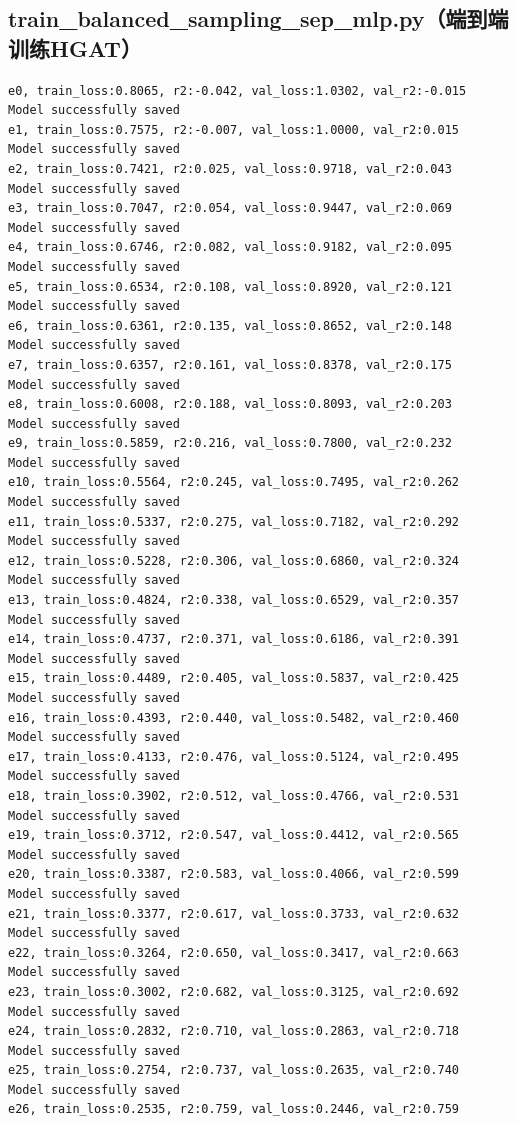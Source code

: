 \documentclass[a4paper, 12pt]{article}
\begin{document}
	\subsection{train\_balanced\_sampling\_sep\_mlp.py（端到端训练HGAT）}	
	\begin{lstlisting}
e0, train_loss:0.8065, r2:-0.042, val_loss:1.0302, val_r2:-0.015
Model successfully saved
e1, train_loss:0.7575, r2:-0.007, val_loss:1.0000, val_r2:0.015
Model successfully saved
e2, train_loss:0.7421, r2:0.025, val_loss:0.9718, val_r2:0.043
Model successfully saved
e3, train_loss:0.7047, r2:0.054, val_loss:0.9447, val_r2:0.069
Model successfully saved
e4, train_loss:0.6746, r2:0.082, val_loss:0.9182, val_r2:0.095
Model successfully saved
e5, train_loss:0.6534, r2:0.108, val_loss:0.8920, val_r2:0.121
Model successfully saved
e6, train_loss:0.6361, r2:0.135, val_loss:0.8652, val_r2:0.148
Model successfully saved
e7, train_loss:0.6357, r2:0.161, val_loss:0.8378, val_r2:0.175
Model successfully saved
e8, train_loss:0.6008, r2:0.188, val_loss:0.8093, val_r2:0.203
Model successfully saved
e9, train_loss:0.5859, r2:0.216, val_loss:0.7800, val_r2:0.232
Model successfully saved
e10, train_loss:0.5564, r2:0.245, val_loss:0.7495, val_r2:0.262
Model successfully saved
e11, train_loss:0.5337, r2:0.275, val_loss:0.7182, val_r2:0.292
Model successfully saved
e12, train_loss:0.5228, r2:0.306, val_loss:0.6860, val_r2:0.324
Model successfully saved
e13, train_loss:0.4824, r2:0.338, val_loss:0.6529, val_r2:0.357
Model successfully saved
e14, train_loss:0.4737, r2:0.371, val_loss:0.6186, val_r2:0.391
Model successfully saved
e15, train_loss:0.4489, r2:0.405, val_loss:0.5837, val_r2:0.425
Model successfully saved
e16, train_loss:0.4393, r2:0.440, val_loss:0.5482, val_r2:0.460
Model successfully saved
e17, train_loss:0.4133, r2:0.476, val_loss:0.5124, val_r2:0.495
Model successfully saved
e18, train_loss:0.3902, r2:0.512, val_loss:0.4766, val_r2:0.531
Model successfully saved
e19, train_loss:0.3712, r2:0.547, val_loss:0.4412, val_r2:0.565
Model successfully saved
e20, train_loss:0.3387, r2:0.583, val_loss:0.4066, val_r2:0.599
Model successfully saved
e21, train_loss:0.3377, r2:0.617, val_loss:0.3733, val_r2:0.632
Model successfully saved
e22, train_loss:0.3264, r2:0.650, val_loss:0.3417, val_r2:0.663
Model successfully saved
e23, train_loss:0.3002, r2:0.682, val_loss:0.3125, val_r2:0.692
Model successfully saved
e24, train_loss:0.2832, r2:0.710, val_loss:0.2863, val_r2:0.718
Model successfully saved
e25, train_loss:0.2754, r2:0.737, val_loss:0.2635, val_r2:0.740
Model successfully saved
e26, train_loss:0.2535, r2:0.759, val_loss:0.2446, val_r2:0.759

\end{lstlisting}
\end{document}

